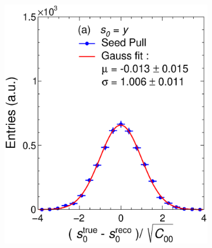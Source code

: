 \begin{figure}[t]
     \centering
     \begin{subfigure}{0.32\textwidth}
         \centering
         \includegraphics[width=\textwidth]{figures/ch4-KF_NDGArLite/Toy/Corr/UnitSeed_p0.eps}
         \caption{}
         \label{fig:resp0Seed_GArLite_Corr}
     \end{subfigure}
     \begin{subfigure}{0.32\textwidth}
         \centering

\end{subfigure}
\end{figure}
